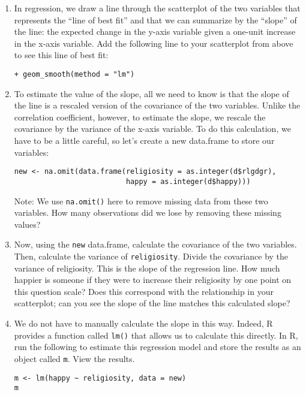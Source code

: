 \documentclass[a4paper,12pt]{article}
\begin{document}
\begin{enumerate}
\item In regression, we draw a line through the scatterplot of the two variables that represents the ``line of best fit'' and that we can summarize by the ``slope'' of the line: the expected change in the y-axis variable given a one-unit increase in the x-axis variable. Add the following line to your scatterplot from above to see this line of best fit:

\begin{verbatim}
+ geom_smooth(method = "lm")
\end{verbatim}

\item To estimate the value of the slope, all we need to know is that the slope of the line is a rescaled version of the covariance of the two variables. Unlike the correlation coefficient, however, to estimate the slope, we rescale the covariance by the variance of the x-axis variable. To do this calculation, we have to be a little careful, so let's create a new data.frame to store our variables:

\begin{verbatim}
new <- na.omit(data.frame(religiosity = as.integer(d$rlgdgr),
                          happy = as.integer(d$happy)))
\end{verbatim}

\noindent Note: We use \texttt{na.omit()} here to remove missing data from these two variables. How many observations did we lose by removing these missing values?

\item Now, using the \texttt{new} data.frame, calculate the covariance of the two variables. Then, calculate the variance of \texttt{religiosity}. Divide the covariance by the variance of religiosity. This is the slope of the regression line. How much happier is someone if they were to increase their religiosity by one point on this question scale? Does this correspond with the relationship in your scatterplot; can you see the slope of the line matches this calculated slope?

\item We do not have to manually calculate the slope in this way. Indeed, R provides a function called \texttt{lm()} that allows us to calculate this directly. In R, run the following to estimate this regression model and store the results as an object called \texttt{m}. View the results.

\begin{verbatim}
m <- lm(happy ~ religiosity, data = new)
m
\end{verbatim}


\end{enumerate}
\end{document}
